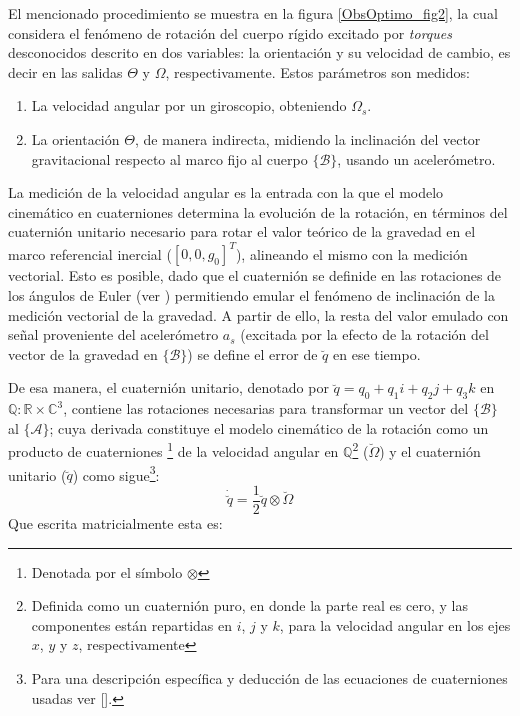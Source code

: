 \documentclass[conference]{IEEEtran}
\newcommand{\marco}[1]{\{\mathcal{#1}\}}
\begin{document}
El mencionado procedimiento se muestra en la figura \ref{ObsOptimo_fig2}, la cual considera el fenómeno de rotación del cuerpo rígido excitado por \emph{torques} desconocidos descrito en dos variables: la orientación y su velocidad de cambio, es decir en las salidas $\Theta$ y $\Omega$, respectivamente. Estos parámetros son medidos:
\begin{enumerate} 
\item La velocidad angular por un giroscopio, obteniendo $\Omega_s$.
\item La orientación $\Theta$, de manera indirecta, midiendo la inclinación del vector gravitacional respecto al marco fijo al cuerpo $\marco{B}$, usando un acelerómetro.
\end{enumerate}
La medición de la velocidad angular es la entrada con la que el modelo cinemático en cuaterniones determina la evolución de la rotación, en términos del cuaternión unitario necesario para rotar el valor teórico de la gravedad en el marco referencial inercial ($[0,0,g_0]^T$), alineando el mismo con la medición vectorial. Esto es posible, dado que el cuaternión se definide en las rotaciones de los ángulos de Euler (ver \cite{Altmann1986}) permitiendo emular el fenómeno de inclinación de la medición vectorial de la gravedad. A partir de ello, la resta del valor emulado con señal proveniente del acelerómetro $a_s$ (excitada por la efecto de la rotación del vector de la gravedad en $\marco{B}$) se define el error de $\breve{q}$ en ese tiempo.\par
De esa manera, el cuaternión unitario, denotado por $\breve{q}=q_0+q_1i+q_2j+q_3k$ en $\mathbb{Q}:\mathbb{R}\times\mathbb{C}^3$, contiene las rotaciones necesarias para transformar un vector del $\marco{B}$ al $\marco{A}$; cuya derivada constituye el modelo cinemático de la rotación como un producto de cuaterniones \footnote{Denotada por el símbolo $\otimes$} de la velocidad angular en $\mathbb{Q}$\footnote{Definida como un cuaternión puro, en donde la parte real es cero, y las componentes están repartidas en $i$, $j$ y $k$, para la velocidad angular en los ejes $x$, $y$ y $z$, respectivamente} ($\breve{\Omega}$) y el cuaternión unitario ($\breve{q}$) como sigue\footnote{ Para una descripción específica y deducción de las ecuaciones de cuaterniones usadas ver [\cite{Kuipers1999}].}:
\begin{equation}
\dot{\breve{q}}=\frac{1}{2}\breve{q}\otimes\breve{\Omega}
\end{equation}
Que escrita matricialmente \cite{Zhong2002} esta es:
\end{document}
